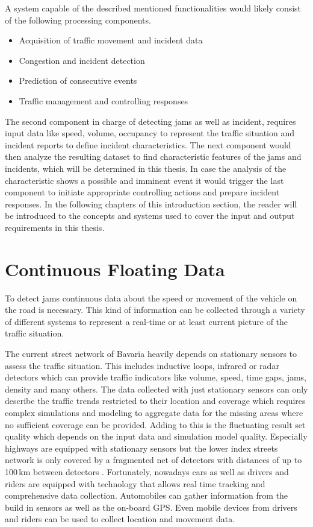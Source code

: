 A system capable of the described mentioned functionalities would likely consist of the following processing components.

\begin{itemize}
  \item Acquisition of traffic movement and incident data
  \item Congestion and incident detection
  \item Prediction of consecutive events
  \item Traffic management and controlling responses
\end{itemize}

The second component in charge of detecting \glspl{jam} as well as incident, requires input data like speed, volume, occupancy to represent the traffic situation and incident reports to define incident characteristics. The next component would then analyze the resulting dataset to find characteristic features of the jams and incidents, which will be determined in this thesis. In case the analysis of the characteristic shows a possible and imminent event it would trigger the last component to initiate appropriate controlling actions and prepare incident responses. In the following chapters of this introduction section, the reader will be introduced to the concepts and systems used to cover the input and output requirements in this thesis.

\section{Continuous Floating Data}

To detect \glspl{jam} continuous data about the speed or movement of the vehicle on the road is necessary. This kind of information can be collected through a variety of different systems to represent a real-time or at least current picture of the traffic situation. 

The current street network of Bavaria heavily depends on stationary sensors to assess the traffic situation. This includes inductive loops, infrared or radar detectors which can provide traffic indicators like volume, speed, time gaps, jams, density and many others. The data collected with just stationary sensors can only describe the traffic trends restricted to their location and coverage which requires complex simulations and modeling to aggregate data for the missing areas where no sufficient coverage can be provided. Adding to this is the fluctuating result set quality which depends on the input data and simulation model quality. Especially highways are equipped with stationary sensors but the lower index streets network is only covered by a fragmented net of detectors with distances of up to 100\,km between detectors \parencite{INDRIX2015}. Fortunately, nowadays cars as well as drivers and riders are equipped with technology that allows real time tracking and comprehensive data collection. Automobiles can gather information from the build in sensors as well as the on-board GPS. Even mobile devices from drivers and riders can be used to collect location and movement data. \parencite{Randelhoff2016}

